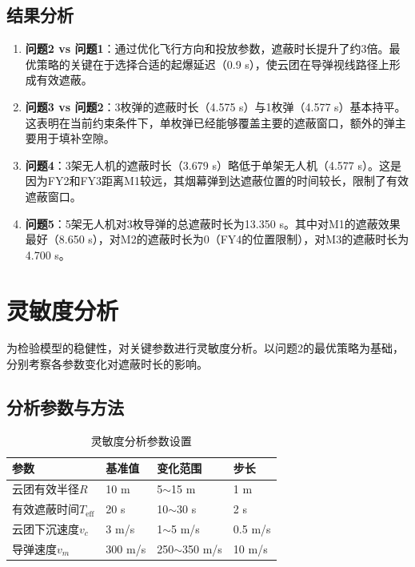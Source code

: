\documentclass[12pt,a4paper]{article}
\begin{document}
\subsection{结果分析}

\begin{enumerate}
    \item \textbf{问题2 vs 问题1}：通过优化飞行方向和投放参数，遮蔽时长提升了约3倍。最优策略的关键在于选择合适的起爆延迟（0.9 s），使云团在导弹视线路径上形成有效遮蔽。

    \item \textbf{问题3 vs 问题2}：3枚弹的遮蔽时长（4.575 s）与1枚弹（4.577 s）基本持平。这表明在当前约束条件下，单枚弹已经能够覆盖主要的遮蔽窗口，额外的弹主要用于填补空隙。

    \item \textbf{问题4}：3架无人机的遮蔽时长（3.679 s）略低于单架无人机（4.577 s）。这是因为FY2和FY3距离M1较远，其烟幕弹到达遮蔽位置的时间较长，限制了有效遮蔽窗口。

    \item \textbf{问题5}：5架无人机对3枚导弹的总遮蔽时长为13.350 s。其中对M1的遮蔽效果最好（8.650 s），对M2的遮蔽时长为0（FY4的位置限制），对M3的遮蔽时长为4.700 s。
\end{enumerate}


\section{灵敏度分析}

为检验模型的稳健性，对关键参数进行灵敏度分析。以问题2的最优策略为基础，分别考察各参数变化对遮蔽时长的影响。

\subsection{分析参数与方法}

\begin{table}[H]
    \centering
    \caption{灵敏度分析参数设置}
    \label{tab:sensitivity_params}
    \begin{tabular}{llll}
        \toprule
        参数 & 基准值 & 变化范围 & 步长 \\
        \midrule
        云团有效半径$R$ & 10 m & 5$\sim$15 m & 1 m \\
        有效遮蔽时间$T_{\text{eff}}$ & 20 s & 10$\sim$30 s & 2 s \\
        云团下沉速度$v_c$ & 3 m/s & 1$\sim$5 m/s & 0.5 m/s \\
        导弹速度$v_m$ & 300 m/s & 250$\sim$350 m/s & 10 m/s \\
        \bottomrule
    \end{tabular}
\end{table}
\end{document}

